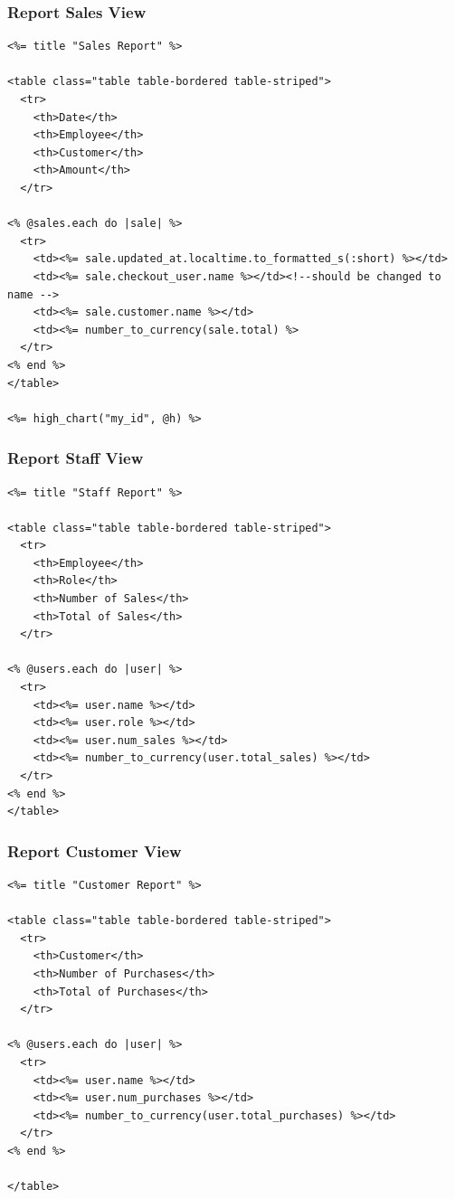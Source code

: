 \documentclass[a4paper]{article}
\begin{document}
\subsubsection{Report Sales View}
\begin{verbatim}
<%= title "Sales Report" %>

<table class="table table-bordered table-striped">
  <tr>
    <th>Date</th>
    <th>Employee</th>
    <th>Customer</th>
    <th>Amount</th>
  </tr>

<% @sales.each do |sale| %>
  <tr>
    <td><%= sale.updated_at.localtime.to_formatted_s(:short) %></td>
    <td><%= sale.checkout_user.name %></td><!--should be changed to name -->
    <td><%= sale.customer.name %></td>
    <td><%= number_to_currency(sale.total) %>
  </tr>
<% end %>
</table>

<%= high_chart("my_id", @h) %>

\end{verbatim}
\subsubsection{Report Staff View}
\begin{verbatim}
<%= title "Staff Report" %>

<table class="table table-bordered table-striped">
  <tr>
    <th>Employee</th>
    <th>Role</th>
    <th>Number of Sales</th>
    <th>Total of Sales</th>
  </tr>

<% @users.each do |user| %>
  <tr>
    <td><%= user.name %></td>
    <td><%= user.role %></td>
    <td><%= user.num_sales %></td>
    <td><%= number_to_currency(user.total_sales) %></td>
  </tr>
<% end %>
</table>

\end{verbatim}
\subsubsection{Report Customer View}
\begin{verbatim}
<%= title "Customer Report" %>

<table class="table table-bordered table-striped">
  <tr>
    <th>Customer</th>
    <th>Number of Purchases</th>
    <th>Total of Purchases</th>
  </tr>

<% @users.each do |user| %>
  <tr>
    <td><%= user.name %></td>
    <td><%= user.num_purchases %></td>
    <td><%= number_to_currency(user.total_purchases) %></td>
  </tr>
<% end %>

</table>

\end{verbatim}
\end{document}
